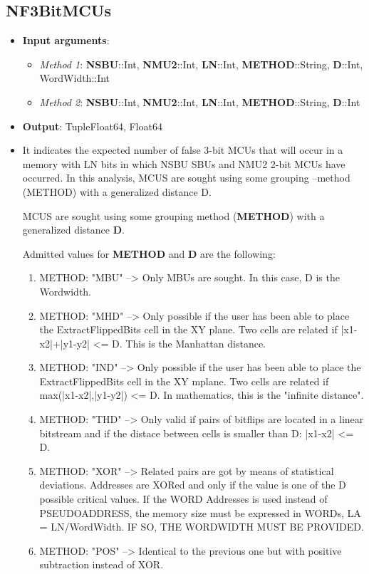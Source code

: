 \subsection*{NF3BitMCUs}
%
\begin{itemize}
	\item \textbf{Input arguments}: 
	\begin{itemize}
		\item \textit{Method 1}: \textbf{NSBU}::Int, \textbf{NMU2}::Int, \textbf{LN}::Int, \textbf{METHOD}::String, \textbf{D}::Int, WordWidth::Int
		\item \textit{Method 2}: \textbf{NSBU}::Int, \textbf{NMU2}::Int, \textbf{LN}::Int, \textbf{METHOD}::String, \textbf{D}::Int
	\end{itemize}
	\item \textbf{Output}: Tuple{Float64, Float64}
	\item     It indicates the expected number of false 3-bit MCUs that will occur 
	 in a memory with LN bits in which NSBU SBUs and NMU2 2-bit MCUs have occurred. 
	 In this analysis, MCUS are sought using some grouping --method (METHOD) with a generalized 
	 distance D.
	
	MCUS are sought using some grouping method (\textbf{METHOD}) with a generalized distance \textbf{D}.
	
	Admitted values for \textbf{METHOD} and \textbf{D} are the following:
	
	\begin{enumerate}
		\item METHOD: "MBU" --> Only MBUs are sought. In this case, D is the Wordwidth.
		\item METHOD: "MHD" --> Only possible if the user has been able to place the ExtractFlippedBits 	 	cell in the XY plane. Two cells are related if |x1-x2|+|y1-y2| <= D. This 
		is the Manhattan distance.
		\item METHOD: "IND" --> Only possible if the user has been able to place the ExtractFlippedBits
		cell in the XY mplane. Two cells are related if max(|x1-x2|,|y1-y2|) <= D.
		In mathematics, this is the "infinite distance".
		\item METHOD: "THD" --> Only valid if pairs of bitflips are located in a linear bitstream and if the
		distace between cells is smaller than D: |x1-x2| <= D.
		\item METHOD: "XOR" --> Related pairs are got by means of statistical deviations. Addresses are XORed 
		and only if the value is one of the D possible critical values. If the WORD Addresses  
		is used instead of PSEUDOADDRESS, the memory size must be expressed in WORDs, 
		LA = LN/WordWidth.
		IF SO, THE WORDWIDTH MUST BE PROVIDED.
		\item METHOD: "POS" --> Identical to the previous one but with positive subtraction instead of XOR.
	\end{enumerate}
	

\end{itemize}
